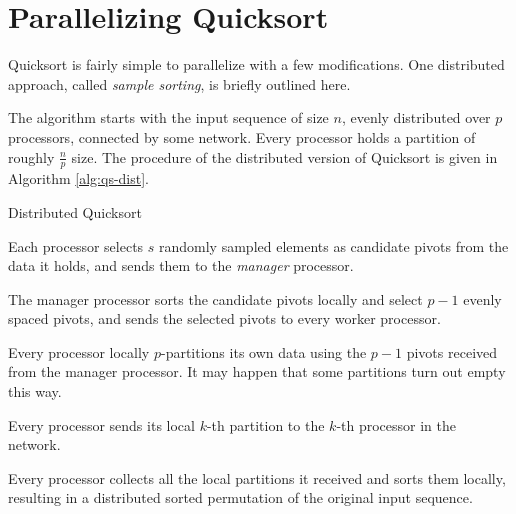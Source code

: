 \documentclass[]{finalproject}
\begin{document}
\section{Parallelizing Quicksort}

Quicksort is fairly simple to parallelize with a few modifications. One distributed approach, called \textit{sample sorting}, is briefly outlined here.

The algorithm starts with the input sequence of size $n$, evenly distributed over $p$ processors, connected by some network.
Every processor holds a partition of roughly $\frac{n}{p}$ size.
The procedure of the distributed version of Quicksort is given in Algorithm \ref{alg:qs-dist}.

\begin{algorithm}
  \caption{Distributed Quicksort}
  \label{alg:qs-dist}
  Each processor selects $s$ randomly sampled elements as candidate pivots from the data it holds, and sends them to the \textit{manager} processor.

  The manager processor sorts the candidate pivots locally and select $p-1$ evenly spaced pivots, and sends the selected pivots to every worker processor.

  Every processor locally $p$-partitions its own data using the $p-1$ pivots received from the manager processor.
  It may happen that some partitions turn out empty this way.

  Every processor sends its local $k$-th partition to the $k$-th processor in the network.

  Every processor collects all the local partitions it received and sorts them locally,
  resulting in a distributed sorted permutation of the original input sequence.
\end{algorithm}
\end{document}
